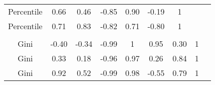 \begin{landscape}
\begin{table}[!htbp]
\begin{tabular}{c|c|c|c|c|c|c|c|c}
{Percentile} & 0.66 & 0.46 & -0.85 & 0.90 & -0.19 & 1 &  \\ 
{Percentile} & 0.71 & 0.83 & -0.82 & 0.71 & -0.80 & 1 &  \\ 
\hline \\[-1.8ex] 
{Gini} & -0.40 & -0.34 & -0.99 & 1 & 0.95 & 0.30 & 1 \\ 
{Gini} & 0.33 & 0.18 & -0.96 & 0.97 & 0.26 & 0.84 & 1 \\ 
{Gini} & 0.92 & 0.52 & -0.99 & 0.98 & -0.55 & 0.79 & 1 \\ 
\end{tabular}
\end{table}

\end{landscape}
 
